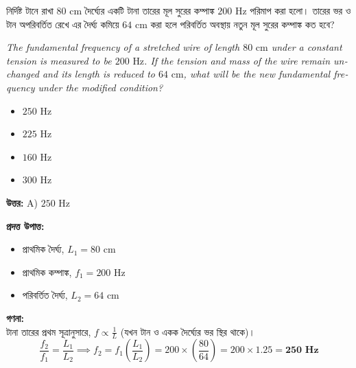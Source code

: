 \documentclass[12pt, a4paper]{article}
\begin{document}
\begin{tcolorbox}[questionbox={প্রশ্ন (Question) 3}]
    \noindent
    নির্দিষ্ট টানে রাখা $80\text{ cm}$ দৈর্ঘ্যের একটি টানা তারের মূল সুরের কম্পাঙ্ক $200\text{ Hz}$ পরিমাপ করা হলো। তারের ভর ও টান অপরিবর্তিত রেখে এর দৈর্ঘ্য কমিয়ে $64\text{ cm}$ করা হলে পরিবর্তিত অবস্থায় নতুন মূল সুরের কম্পাঙ্ক কত হবে?
    
    \vspace{0.8em}
    \begin{english}
    \noindent\textit{\color{darkgray}
    The fundamental frequency of a stretched wire of length $80\text{ cm}$ under a constant tension is measured to be $200\text{ Hz}$. If the tension and mass of the wire remain unchanged and its length is reduced to $64\text{ cm}$, what will be the new fundamental frequency under the modified condition?
    }
    \end{english}
\end{tcolorbox}

\begin{itemize}[label={}, leftmargin=1cm, itemsep=0.5em]
    \item[\textbf{A)}] $250\text{ Hz}$
    \item[\textbf{B)}] $225\text{ Hz}$
    \item[\textbf{C)}] $160\text{ Hz}$
    \item[\textbf{D)}] $300\text{ Hz}$
\end{itemize}

\vspace{0.5em}
\begin{tcolorbox}[answerbox]
    \textbf{\color{success} উত্তর:} A) $250\text{ Hz}$
\end{tcolorbox}
\vspace{1em}

\begin{tcolorbox}[solutionbox={সমাধান (Solution)}]
    \noindent
    \textbf{প্রদত্ত উপাত্ত:}
    \begin{itemize}[leftmargin=1.5em, itemsep=0.2em]
        \item প্রাথমিক দৈর্ঘ্য, $L_1 = 80\text{ cm}$
        \item প্রাথমিক কম্পাঙ্ক, $f_1 = 200\text{ Hz}$
        \item পরিবর্তিত দৈর্ঘ্য, $L_2 = 64\text{ cm}$
    \end{itemize}

    \vspace{0.6em}
    \noindent\textbf{গণনা:} \\
    টানা তারের প্রথম সূত্রানুসারে, $f \propto \frac{1}{L}$ (যখন টান ও একক দৈর্ঘ্যের ভর স্থির থাকে)।
    \[ \frac{f_2}{f_1} = \frac{L_1}{L_2} \implies f_2 = f_1 \left(\frac{L_1}{L_2}\right) = 200 \times \left(\frac{80}{64}\right) = 200 \times 1.25 = \mathbf{250\text{ Hz}} \]
\end{tcolorbox}
\end{document}
